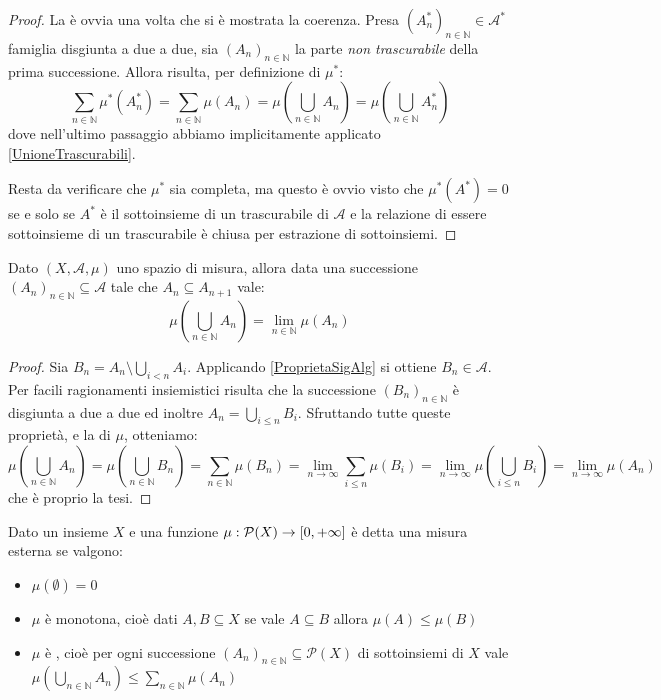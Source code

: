 \begin{proof}
	La \sigadd[ità] è ovvia una volta che si è mostrata la coerenza. Presa $(A^*_n)_{n\in\mathbb N}\in\mathcal A^*$ famiglia disgiunta a due a due, sia $(A_n)_{n\in\mathbb N}$ la parte \emph{non trascurabile} della prima successione. Allora risulta, per definizione di $\mu^*$:
	\begin{equation*}
		\sum_{n\in\mathbb N} \mu^*(A^*_n)=\sum_{n\in\mathbb N} \mu(A_n)=\mu\left(\bigcup_{n\in\mathbb N} A_n\right)=\mu\left(\bigcup_{n\in\mathbb N} A^*_n\right)
	\end{equation*}
	dove nell'ultimo passaggio abbiamo implicitamente applicato \cref{UnioneTrascurabili}.
	
	Resta da verificare che $\mu^*$ sia completa, ma questo è ovvio visto che  $\mu^*(A^*)=0$ se e solo se $A^*$ è il sottoinsieme di un trascurabile di $\mathcal A$ e la relazione di essere sottoinsieme di un trascurabile è chiusa per estrazione di sottoinsiemi. 

\end{proof}



\begin{proposition}\label{LimiteMonotonoMisura}
	Dato $(X,\mathcal A,\mu)$ uno spazio di misura, allora data una successione $(A_n)_{n\in\mathbb N}\subseteq \mathcal A$ tale che $A_n\subseteq A_{n+1}$ vale:
	\begin{equation*}
		\mu\left(\bigcup_{n\in\mathbb N} A_n\right)=\lim_{n\in\mathbb N} \mu(A_n)
	\end{equation*}
\end{proposition}
\begin{proof}
	Sia $B_n=A_n\setminus\bigcup_{i<n}A_i$. Applicando \cref{ProprietaSigAlg} si ottiene $B_n\in\mathcal A$.
	Per facili ragionamenti insiemistici risulta che la successione $(B_n)_{n\in\mathbb N}$ è disgiunta a due a due ed inoltre $A_n=\bigcup_{i\le n}B_i$.
	Sfruttando tutte queste proprietà, e la \sigadd[ità] di $\mu$, otteniamo:
	\begin{equation*}
		\mu\left(\bigcup_{n\in\mathbb N} A_n\right)=\mu\left(\bigcup_{n\in\mathbb N} B_n\right)=
		\sum_{n\in\mathbb N} \mu(B_n)=\lim_{n\to\infty} \sum_{i\le n} \mu(B_i)=
		\lim_{n\to\infty} \mu\left(\bigcup_{i\le n} B_i\right)=\lim_{n\to\infty} \mu(A_n)
	\end{equation*}
	che è proprio la tesi.
\end{proof}

\begin{definition}
	Dato un insieme $X$ e una funzione $\mu:\mathcal P(X)\to [0,+\infty]$ è detta una misura esterna se valgono:
	\begin{itemize}
		\item $\mu(\emptyset)=0$
		\item $\mu$ è monotona, cioè dati $A,B\subseteq X$ se vale $A\subseteq B$ allora $\mu(A)\le \mu(B)$
		\item $\mu$ è \sigsubadd{}, cioè  per ogni successione $(A_n)_{n\in\mathbb N}\subseteq \mathcal P(X)$ di sottoinsiemi di $X$ vale $\mu\left(\bigcup_{n\in\mathbb{N}}A_n\right)\le \sum_{n\in\mathbb N} \mu(A_n)$
	\end{itemize}
\end{definition}

